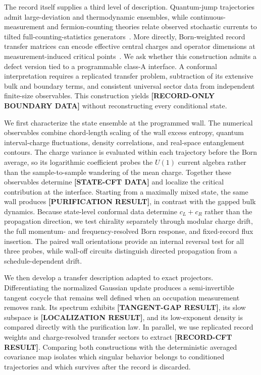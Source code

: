 \documentclass[aps,prx,twocolumn,superscriptaddress,longbibliography,nofootinbib,floatfix]{revtex4-2}
\newcommand{\ResultValue}[1]{\textcolor{BrickRed}{\textbf{[#1]}}}
\begin{document}
The record itself supplies a third level of description.  Quantum-jump trajectories admit large-deviation and thermodynamic ensembles, while continuous-measurement and fermion-counting theories relate observed stochastic currents to tilted full-counting-statistics generators~\cite{GarrahanLesanovsky2010,Landi2024,Starchl2025,KloiberTollingerSieberer2026}.  More directly, Born-weighted record transfer matrices can encode effective central charges and operator dimensions at measurement-induced critical points~\cite{Zabalo2022}.  We ask whether this construction admits a defect version tied to a programmable class-A interface.  A conformal interpretation requires a replicated transfer problem, subtraction of its extensive bulk and boundary terms, and consistent universal sector data from independent finite-size observables.  This construction yields \ResultValue{RECORD-ONLY BOUNDARY DATA} without reconstructing every conditional state.

We first characterize the state ensemble at the programmed wall.  The numerical observables combine chord-length scaling of the wall excess entropy, quantum interval-charge fluctuations, density correlations, and real-space entanglement contours.  The charge variance is evaluated within each trajectory before the Born average, so its logarithmic coefficient probes the $U(1)$ current algebra rather than the sample-to-sample wandering of the mean charge.  Together these observables determine \ResultValue{STATE-CFT DATA} and localize the critical contribution at the interface.  Starting from a maximally mixed state, the same wall produces \ResultValue{PURIFICATION RESULT}, in contrast with the gapped bulk dynamics.  Because state-level conformal data determine $c_L+c_R$ rather than the propagation direction, we test chirality separately through modular charge drift, the full momentum- and frequency-resolved Born response, and fixed-record flux insertion.  The paired wall orientations provide an internal reversal test for all three probes, while wall-off circuits distinguish directed propagation from a schedule-dependent drift.

We then develop a transfer description adapted to exact projectors.  Differentiating the normalized Gaussian update produces a semi-invertible tangent cocycle that remains well defined when an occupation measurement removes rank.  Its spectrum exhibits \ResultValue{TANGENT-GAP RESULT}, its slow subspace is \ResultValue{LOCALIZATION RESULT}, and its low-exponent density is compared directly with the purification law.  In parallel, we use replicated record weights and charge-resolved transfer sectors to extract \ResultValue{RECORD-CFT RESULT}.  Comparing both constructions with the deterministic averaged covariance map isolates which singular behavior belongs to conditioned trajectories and which survives after the record is discarded.
\end{document}
